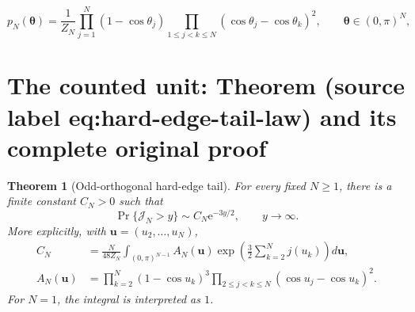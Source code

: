 \documentclass[10pt,a4paper]{amsart}
\newcommand{\e}{\mathrm{e}}
\theoremstyle{plain}
\newtheorem{theorem}{Theorem}
\theoremstyle{remark}
\begin{document}
\begin{equation}
  p_N(\boldsymbol\theta)
  =\frac1{Z_N}\prod_{j=1}^{N}(1-\cos\theta_j)
   \prod_{1\le j<k\le N}(\cos\theta_j-\cos\theta_k)^2,
  \qquad \boldsymbol\theta\in(0,\pi)^N,
  \label{eq:SOodd-Weyl-density}
\end{equation}


\section{The counted unit: Theorem (source label eq:hard-edge-tail-law) and its complete original proof}

\begin{theorem}[Odd-orthogonal hard-edge tail]
For every fixed $N\ge1$, there is a finite constant $C_N>0$ such that
\begin{equation}
  \Pr\{\mathcal J_N>y\}
  \sim C_N\e^{-3y/2},
  \qquad y\to\infty.
  \label{eq:hard-edge-tail-law}
\end{equation}
More explicitly, with $\mathbf u=(u_2,\ldots,u_N)$,
\begin{align}
  C_N&=\frac{N}{48Z_N}\int_{(0,\pi)^{N-1}}
  A_N(\mathbf u)
  \exp\!\left(\frac32\sum_{k=2}^{N}j(u_k)\right)d\mathbf u,
  \label{eq:hard-edge-constant}\\
  A_N(\mathbf u)&=
  \prod_{k=2}^{N}(1-\cos u_k)^3
  \prod_{2\le j<k\le N}(\cos u_j-\cos u_k)^2.
  \label{eq:hard-edge-boundary-density}
\end{align}
For $N=1$, the integral is interpreted as $1$.
\end{theorem}
\end{document}
